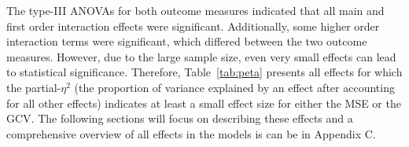 \documentclass[man, floatsintext]{apa7}
\begin{document}
The type-III ANOVAs for both outcome measures indicated that all main and first
order interaction effects were significant. Additionally, some higher order
interaction terms were significant, which differed between the two outcome
measures. However, due to the large sample size, even very small effects can
lead to statistical significance. Therefore, Table~\ref{tab:peta} presents all
effects for which the partial-$\eta^2$ (the proportion of variance explained by
an effect after accounting for all other effects) indicates at least a small
effect size for either the MSE or the GCV\@. The following sections will focus
on describing these effects and a comprehensive overview of all effects in the
models is can be in Appendix C.

\begin{table}[tbp]


\end{table}
\end{document}

